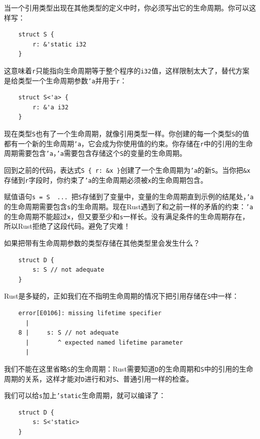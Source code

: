 当一个引用类型出现在其他类型的定义中时，你必须写出它的生命周期。你可以这样写：
\begin{verbatim}
    struct S {
        r: &'static i32
    }
\end{verbatim}

这意味着\texttt{r}只能指向生命周期等于整个程序的\texttt{i32}值，这样限制太大了，替代方案是给类型一个生命周期参数\texttt{'a}并用于\texttt{r}：
\begin{verbatim}
    struct S<'a> {
        r: &'a i32
    }
\end{verbatim}

现在类型\texttt{S}也有了一个生命周期，就像引用类型一样。你创建的每一个类型\texttt{S}的值都有一个新的生命周期\texttt{'a}，它会成为你使用值的约束。你存储在\texttt{r}中的引用的生命周期需要包含\texttt{'a}，\texttt{'a}需要包含存储这个\texttt{S}的变量的生命周期。

回到之前的代码，表达式\texttt{S \{ r: \&x \}}创建了一个生命周期为\texttt{'a}的新\texttt{S}。当你把\texttt{\&x}存储到\texttt{r}字段时，你约束了\texttt{'a}的生命周期必须被\texttt{x}的生命周期包含。

赋值语句\texttt{s = S { ... }}把\texttt{S}存储到了变量中，变量的生命周期直到示例的结尾处，\texttt{'a}的生命周期需要包含\texttt{s}的生命周期。现在Rust遇到了和之前一样的矛盾的约束：\texttt{'a}的生命周期不能超过\texttt{x}，但又要至少和\texttt{s}一样长。没有满足条件的生命周期存在，所以Rust拒绝了这段代码。避免了灾难！

如果把带有生命周期参数的类型存储在其他类型里会发生什么？
\begin{verbatim}
    struct D {
        s: S // not adequate
    }
\end{verbatim}

Rust是多疑的，正如我们在不指明生命周期的情况下把引用存储在\texttt{S}中一样：
\begin{verbatim}
    error[E0106]: missing lifetime specifier
      |
    8 |     s: S // not adequate
      |        ^ expected named lifetime parameter
      |
\end{verbatim}

我们不能在这里省略\texttt{S}的生命周期：Rust需要知道\texttt{D}的生命周期和\texttt{S}中的引用的生命周期的关系，这样才能对\texttt{D}进行和对\texttt{S}、普通引用一样的检查。

我们可以给\texttt{s}加上\texttt{'static}生命周期，就可以编译了：
\begin{verbatim}
    struct D {
        s: S<'static>
    }
\end{verbatim}

